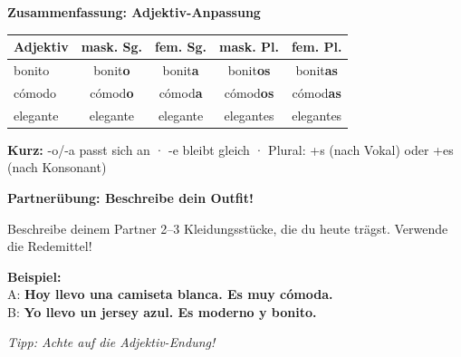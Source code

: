 \documentclass[11pt, a4paper]{article}
\newcommand{\seriftext}[1]{{\fontfamily{ppl}\selectfont #1}}
\newcommand{\es}[1]{\seriftext{\textbf{#1}}}
\begin{document}
\begin{merkbox}
\textbf{Zusammenfassung: Adjektiv-Anpassung}

\vspace{4pt}
\begin{center}
\begin{tabular}{|l|c|c|c|c|}
\hline
\textbf{Adjektiv} & \textbf{mask. Sg.} & \textbf{fem. Sg.} & \textbf{mask. Pl.} & \textbf{fem. Pl.} \\
\hline
bonito & bonit\textbf{o} & bonit\textbf{a} & bonit\textbf{os} & bonit\textbf{as} \\
\hline
cómodo & cómod\textbf{o} & cómod\textbf{a} & cómod\textbf{os} & cómod\textbf{as} \\
\hline
elegante & elegante & elegante & elegantes & elegantes \\
\hline
\end{tabular}
\end{center}

\vspace{4pt}
{\small\textbf{Kurz:} -o/-a passt sich an · -e bleibt gleich · Plural: +s (nach Vokal) oder +es (nach Konsonant)}
\end{merkbox}

\vspace{6pt}


\begin{tcolorbox}[
    colback=white, colframe=rahmen, boxrule=0.5pt, arc=0pt,
    left=8pt, right=8pt, top=6pt, bottom=6pt,
    borderline north={1.5pt}{0pt}{spanisch}
]
{\small\textbf{Partnerübung: Beschreibe dein Outfit!}}

\vspace{4pt}
\footnotesize
Beschreibe deinem Partner 2--3 Kleidungsstücke, die du heute trägst. Verwende die Redemittel!

\vspace{4pt}
\textbf{Beispiel:}\\
A: \es{Hoy llevo una camiseta blanca. Es muy cómoda.}\\
B: \es{Yo llevo un jersey azul. Es moderno y bonito.}

\vspace{4pt}
\textit{Tipp: Achte auf die Adjektiv-Endung!}
\end{tcolorbox}
\end{document}
